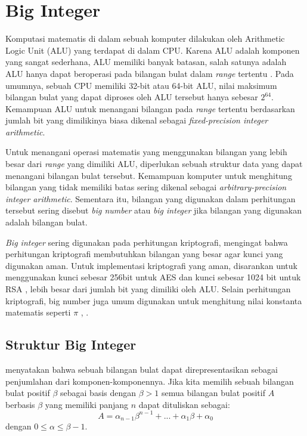 \section{Big Integer}
Komputasi matematis di dalam sebuah komputer dilakukan oleh Arithmetic Logic Unit (ALU) yang terdapat di dalam CPU. Karena ALU adalah komponen yang sangat sederhana, ALU memiliki banyak batasan, salah satunya adalah ALU hanya dapat beroperasi pada bilangan bulat dalam \textit{range} tertentu \citep{comp_org_arch}. Pada umumnya, sebuah CPU memiliki 32-bit atau 64-bit ALU, nilai maksimum bilangan bulat yang dapat diproses oleh ALU tersebut hanya sebesar $2^{64}$. Kemampuan ALU untuk menangani bilangan pada \textit{range} tertentu berdasarkan jumlah bit yang dimilikinya biasa dikenal sebagai \textit{fixed-precision integer arithmetic}.

Untuk menangani operasi matematis yang menggunakan bilangan yang lebih besar dari \textit{range} yang dimiliki ALU, diperlukan sebuah struktur data yang dapat menangani bilangan bulat tersebut. Kemampuan komputer untuk menghitung bilangan yang tidak memiliki batas sering dikenal sebagai \textit{arbitrary-precision integer arithmetic}. Sementara itu, bilangan yang digunakan dalam perhitungan tersebut sering disebut \textit{big number} atau \textit{big integer} jika bilangan yang digunakan adalah bilangan bulat.

\textit{Big integer} sering digunakan pada perhitungan kriptografi, mengingat bahwa perhitungan kriptografi membutuhkan bilangan yang besar agar kunci yang digunakan aman. Untuk implementasi kriptografi yang aman, disarankan untuk menggunakan kunci sebesar 256bit untuk AES dan kunci sebesar 1024 bit untuk RSA \citep{key_suggestion}, lebih besar dari jumlah bit yang dimiliki oleh ALU. Selain perhitungan kriptografi, big number juga umum digunakan untuk menghitung nilai konstanta matematis seperti $\pi$ \citep{bn_pi}, .
\subsection{Struktur Big Integer}
\citet{modern_comp_math} menyatakan bahwa sebuah bilangan bulat dapat direpresentasikan sebagai penjumlahan dari komponen-komponennya. Jika kita memilih sebuah bilangan bulat positif $\beta$ sebagai basis dengan $\beta > 1 $ semua bilangan bulat positif $A$ berbasis $\beta$ yang memiliki panjang $n$ dapat dituliskan sebagai:
\begin{equation}
  A = \alpha_{n-1}\beta^{n-1}+...+\alpha_{1}\beta+\alpha_{0}
\end{equation}
dengan $0 \leq \alpha \leq \beta -1$.

